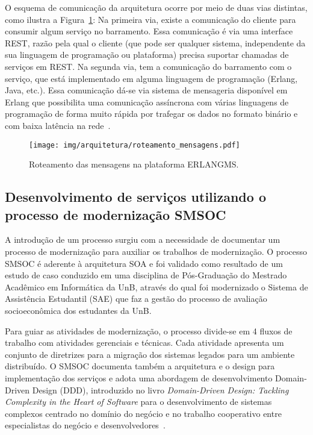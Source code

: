 \documentclass[12pt]{article}
\begin{document}
O esquema de comunicação da arquitetura ocorre por meio de 
duas vias distintas, como ilustra a Figura~\ref{fig:roteamento_mensagens}: Na primeira via, 
existe a comunicação do cliente para 
consumir algum serviço no barramento. Essa comunicação é via uma 
interface REST, razão pela qual o cliente (que pode ser qualquer sistema, 
independente da sua linguagem de programação ou plataforma) 
precisa suportar chamadas de serviços em REST. Na segunda via, tem a comunicação 
do barramento com o serviço, que está implementado em 
alguma linguagem de programação (Erlang, Java, etc.). Essa comunicação dá-se via
sistema de mensageria disponível em Erlang que possibilita uma comunicação assíncrona 
com várias linguagens de programação de forma muito rápida por trafegar os dados 
no formato binário e com baixa latência na rede~\cite{Armstrong:2013:PES:2566708}.

\begin{figure}[htb]
\centering
\texttt{[image: img/arquitetura/roteamento\_mensagens.pdf]}
\caption{Roteamento das mensagens na plataforma ERLANGMS.}
\label{fig:roteamento_mensagens}
\end{figure}






\subsection{Desenvolvimento de serviços utilizando o processo de modernização SMSOC}\label{smsoc}

A introdução de um processo surgiu com a necessidade
de documentar um processo de modernização 
para auxiliar os trabalhos de modernização.
O processo SMSOC é 
aderente à arquitetura SOA 
e foi validado como  
resultado de um estudo de caso
conduzido em uma disciplina de Pós-Graduação
do Mestrado Acadêmico em Informática da UnB,
através do qual foi modernizado 
o Sistema de Assistência Estudantil (SAE)
que faz a gestão do processo de 
avaliação socioeconômica dos estudantes da UnB.

Para guiar as atividades de modernização, o processo 
divide-se em 4 fluxos de trabalho com atividades gerenciais e técnicas. Cada
atividade apresenta um conjunto de diretrizes para
a migração dos sistemas legados para um ambiente distribuído. 
O SMSOC documenta também a arquitetura e o design
para implementação dos serviços e adota uma 
abordagem de desenvolvimento Domain-Driven
Design (DDD), introduzido no livro \textit{Domain-Driven Design: Tackling Complexity in the
Heart of Software} para o desenvolvimento de sistemas complexos centrado no domínio
do negócio e no trabalho cooperativo entre especialistas do negócio e desenvolvedores~\cite{evans2004domain}.
\end{document}
